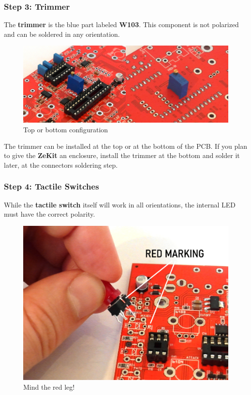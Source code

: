 \documentclass{scrartcl}
\begin{document}
\subsubsection{Step 3: Trimmer}

The \textbf{trimmer} is the blue part labeled \textbf{W103}. This component is not polarized and can be soldered in any orientation.

\begin{figure}[!ht]
    \begin{center}
        \includegraphics[scale=0.35]{assets/pcb-trimmer.jpg}
        \caption{Top or bottom configuration}
    \end{center}
\end{figure}

The trimmer can be installed at the top or at the bottom of the PCB. If you plan to give the \textbf{ZeKit} an enclosure, install the trimmer at the bottom and solder it later, at the connectors soldering step.

\subsubsection{Step 4: Tactile Switches}

While the \textbf{tactile switch} itself will work in all orientations, the internal LED must have the correct polarity.

\begin{figure}[!ht]
    \begin{center}
        \includegraphics[scale=0.30]{assets/tact-marking.jpg}
        \caption{Mind the red leg!}
    \end{center}
\end{figure}
\end{document}
